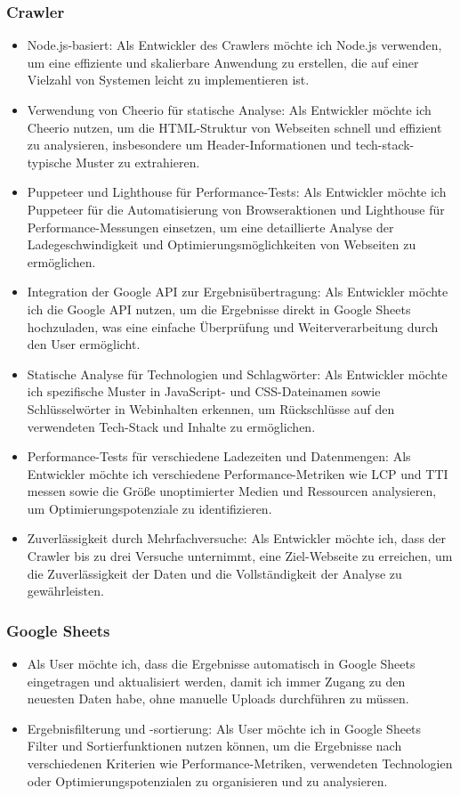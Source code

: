 \documentclass[Bachelor,BIF,german,IEEE]{BASE/twbook}
\begin{document}
\subsubsection{Crawler}
\begin{itemize}
    \item Node.js-basiert: Als Entwickler des Crawlers möchte ich Node.js verwenden, um eine effiziente und skalierbare Anwendung zu erstellen, die auf einer Vielzahl von Systemen leicht zu implementieren ist.
    \item Verwendung von Cheerio für statische Analyse: Als Entwickler möchte ich Cheerio nutzen, um die HTML-Struktur von Webseiten schnell und effizient zu analysieren, insbesondere um Header-Informationen und tech-stack-typische Muster zu extrahieren.
    \item Puppeteer und Lighthouse für Performance-Tests: Als Entwickler möchte ich Puppeteer für die Automatisierung von Browseraktionen und Lighthouse für Performance-Messungen einsetzen, um eine detaillierte Analyse der Ladegeschwindigkeit und Optimierungsmöglichkeiten von Webseiten zu ermöglichen.
    \item Integration der Google API zur Ergebnisübertragung: Als Entwickler möchte ich die Google API nutzen, um die Ergebnisse direkt in Google Sheets hochzuladen, was eine einfache Überprüfung und Weiterverarbeitung durch den User ermöglicht.
    \item Statische Analyse für Technologien und Schlagwörter: Als Entwickler möchte ich spezifische Muster in JavaScript- und CSS-Dateinamen sowie Schlüsselwörter in Webinhalten erkennen, um Rückschlüsse auf den verwendeten Tech-Stack und Inhalte zu ermöglichen.
    \item Performance-Tests für verschiedene Ladezeiten und Datenmengen: Als Entwickler möchte ich verschiedene Performance-Metriken wie \ac{LCP} und \ac{TTI} messen sowie die Größe unoptimierter Medien und Ressourcen analysieren, um Optimierungspotenziale zu identifizieren.
    \item Zuverlässigkeit durch Mehrfachversuche: Als Entwickler möchte ich, dass der Crawler bis zu drei Versuche unternimmt, eine Ziel-Webseite zu erreichen, um die Zuverlässigkeit der Daten und die Vollständigkeit der Analyse zu gewährleisten.
\end{itemize}

\subsubsection{Google Sheets}
\begin{itemize}
    \item Als User möchte ich, dass die Ergebnisse automatisch in Google Sheets eingetragen und aktualisiert werden, damit ich immer Zugang zu den neuesten Daten habe, ohne manuelle Uploads durchführen zu müssen.
    \item Ergebnisfilterung und -sortierung: Als User möchte ich in Google Sheets Filter und Sortierfunktionen nutzen können, um die Ergebnisse nach verschiedenen Kriterien wie Performance-Metriken, verwendeten Technologien oder Optimierungspotenzialen zu organisieren und zu analysieren.
\end{itemize}
\end{document}
